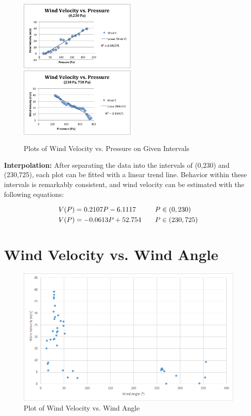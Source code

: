 \documentclass{article}
\begin{document}
\begin{figure}[H]
\centering
\includegraphics[width=2.25in]{LPANDA.png}\hfill \includegraphics[width=2.25in]{RPANDA.png}
\caption{Plots of Wind Velocity vs. Pressure on Given Intervals}
\end{figure}

\begin{flushleft}
\textbf{Interpolation:} After separating the data into the intervals of (0,230) and (230,725), each plot can be fitted with a linear trend line.  Behavior within these intervals is remarkably consistent, and wind velocity can be estimated with the following equations:
\end{flushleft}

\begin{align*}
\centering
    V(P) &= 0.2107P - 6.1117&& \text{\quad $P\in(0,230)$} \\
    V(P) &= -0.0613P + 52.754 && \text{\quad $P\in(230,725)$} \\
\end{align*}
\part{Wind Velocity vs. Wind Angle}
\begin{figure}[H]
  \centering
  \includegraphics[width=\textwidth]{alan-data.png}
  \caption{Plot of Wind Velocity vs. Wind Angle}
\end{figure}
\end{document}
